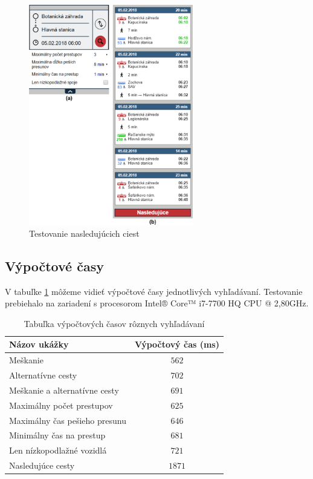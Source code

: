 \begin{figure}[H]
\centerline{\includegraphics[width=0.64\textwidth]{images/test/next-paths-1}}
\caption[Testovanie nasledujúcich ciest]{Testovanie nasledujúcich ciest}
\label{fig:test-next-paths}
\end{figure}



\subsection{Výpočtové časy}
V tabuľke \ref{table:execution-time} môžeme vidieť výpočtové časy jednotlivých vyhľadávaní. Testovanie prebiehalo na zariadení s procesorom Intel® Core™ i7-7700 HQ CPU @ 2,80GHz.
\begin{table}[H]
\small
\begin{center}
\begin{tabular}{|l|c|}
\hline
\rowcolor[HTML]{C0C0C0} 
\textbf{Názov ukážky} & \textbf{Výpočtový čas (ms)} \\ \hline
Meškanie  & $562$         \\ \hline
Alternatívne cesty & $702$  \\ \hline
Meškanie a alternatívne cesty & $691$  \\ \hline
Maximálny počet prestupov & $625$  \\ \hline
Maximálny čas pešieho presunu & $646$  \\ \hline
Minimálny čas na prestup & $681$  \\ \hline
Len nízkopodlažné vozidlá & $721$  \\ \hline
Nasledujúce cesty & $1871$  \\ \hline
\end{tabular}
\end{center}
\caption{Tabuľka výpočtových časov rôznych vyhľadávaní}
\label{table:execution-time}
\end{table}

